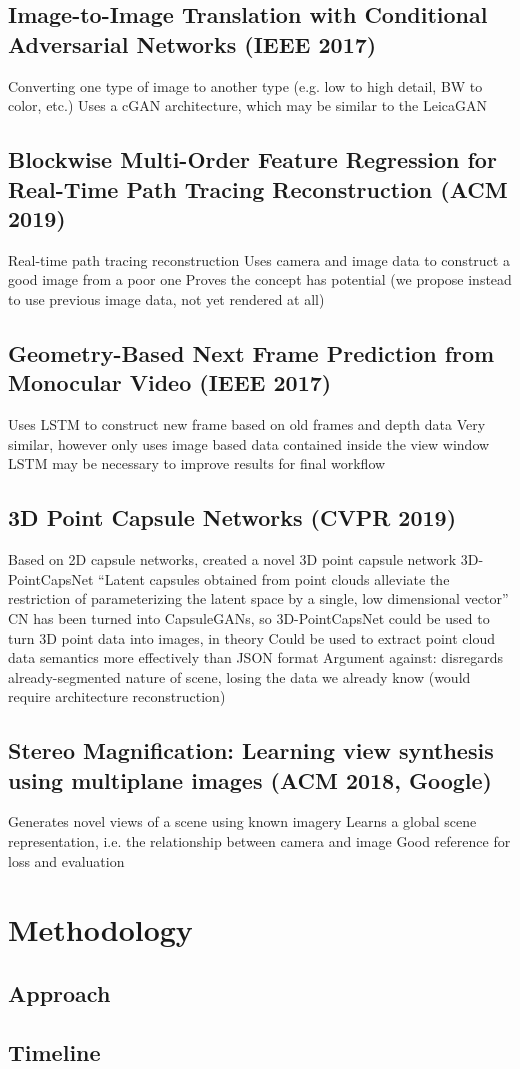\documentclass{article}
\begin{document}
\subsection*{Image-to-Image Translation with Conditional Adversarial Networks (IEEE 2017)}
Converting one type of image to another type (e.g. low to high detail, BW to color, etc.)
Uses a cGAN architecture, which may be similar to the LeicaGAN

\subsection*{Blockwise Multi-Order Feature Regression for Real-Time Path Tracing Reconstruction (ACM 2019)}
Real-time path tracing reconstruction
Uses camera and image data to construct a good image from a poor one
Proves the concept has potential (we propose instead to use previous image data, not yet rendered at all)

\subsection*{Geometry-Based Next Frame Prediction from Monocular Video (IEEE 2017)}
Uses LSTM to construct new frame based on old frames and depth data
Very similar, however only uses image based data contained inside the view window
LSTM may be necessary to improve results for final workflow

\subsection*{3D Point Capsule Networks (CVPR 2019)}
Based on 2D capsule networks, created a novel 3D point capsule network 3D-PointCapsNet
“Latent capsules obtained from point clouds alleviate the restriction of parameterizing the latent space by a single, low dimensional vector”
CN has been turned into CapsuleGANs, so 3D-PointCapsNet could be used to turn 3D point data into images, in theory
Could be used to extract point cloud data semantics more effectively than JSON format
Argument against: disregards already-segmented nature of scene, losing the data we already know (would require architecture reconstruction)

\subsection*{Stereo Magnification: Learning view synthesis using multiplane images (ACM 2018, Google)}
Generates novel views of a scene using known imagery
Learns a global scene representation, i.e. the relationship between camera and image
Good reference for loss and evaluation

\section{Methodology}
\label{sec:methodology}

\subsection{Approach}
\label{subsec:approach}

\subsection{Timeline}
\label{subsec:timeline}



\end{document}
